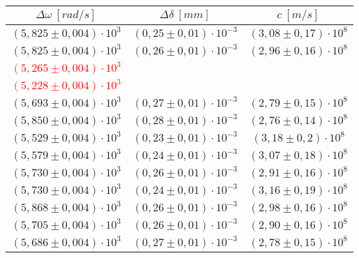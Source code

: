 \begin{table}[H]
    \centering
        \begin{tabular}{|c|c|c|}
        \hline
        $ \Delta\omega~[rad/s] $ & $ \Delta\delta~[mm] $ & $ c~[m/s] $\\
        \hline
        $ (5,825 \pm 0,004) \cdot 10^{3} $ & $ (0,25 \pm 0,01) \cdot 10^{-3} $ & $ (3,08 \pm 0,17) \cdot 10^{8} $\\
        \hline
        $ (5,825 \pm 0,004) \cdot 10^{3} $ & $ (0,26 \pm 0,01) \cdot 10^{-3} $ & $ (2,96 \pm 0,16) \cdot 10^{8} $\\
        \hline
        \textcolor{red}{$ (5,265 \pm 0,004) \cdot 10^{3} $} & \textcolor{red}{$ (0,28 \pm 0,01) \cdot 10^{-3} $ &} \textcolor{red}{$ (2,50 \pm 0,13) \cdot 10^{8} $}\\
        \hline
        \textcolor{red}{$ (5,228 \pm 0,004) \cdot 10^{3} $} & \textcolor{red}{$ (0,18 \pm 0,01) \cdot 10^{-3} $ &} \textcolor{red}{$ (2,47 \pm 0,12) \cdot 10^{8} $}\\
        \hline
        $ (5,693 \pm 0,004) \cdot 10^{3} $ & $ (0,27 \pm 0,01) \cdot 10^{-3} $ & $ (2,79 \pm 0,15) \cdot 10^{8} $\\
        \hline
        $ (5,850 \pm 0,004) \cdot 10^{3} $ & $ (0,28 \pm 0,01) \cdot 10^{-3} $ & $ (2,76 \pm 0,14) \cdot 10^{8} $\\
        \hline
        $ (5,529 \pm 0,004) \cdot 10^{3} $ & $ (0,23 \pm 0,01) \cdot 10^{-3} $ & $ (3,18 \pm 0,2) \cdot 10^{8} $\\
        \hline
        $ (5,579 \pm 0,004) \cdot 10^{3} $ & $ (0,24 \pm 0,01) \cdot 10^{-3} $ & $ (3,07 \pm 0,18) \cdot 10^{8} $\\
        \hline
        $ (5,730 \pm 0,004) \cdot 10^{3} $ & $ (0,26 \pm 0,01) \cdot 10^{-3} $ & $ (2,91 \pm 0,16) \cdot 10^{8} $\\
        \hline
        $ (5,730 \pm 0,004) \cdot 10^{3} $ & $ (0,24 \pm 0,01) \cdot 10^{-3} $ & $ (3,16 \pm 0,19) \cdot 10^{8} $\\
        \hline
        $ (5,868 \pm 0,004) \cdot 10^{3} $ & $ (0,26 \pm 0,01) \cdot 10^{-3} $ & $ (2,98 \pm 0,16) \cdot 10^{8} $\\
        \hline
        $ (5,705 \pm 0,004) \cdot 10^{3} $ & $ (0,26 \pm 0,01) \cdot 10^{-3} $ & $ (2,90 \pm 0,16) \cdot 10^{8} $\\
        \hline
        $ (5,686 \pm 0,004) \cdot 10^{3} $ & $ (0,27 \pm 0,01) \cdot 10^{-3} $ & $ (2,78 \pm 0,15) \cdot 10^{8} $\\
        \hline

\end{tabular}
\end{table}
